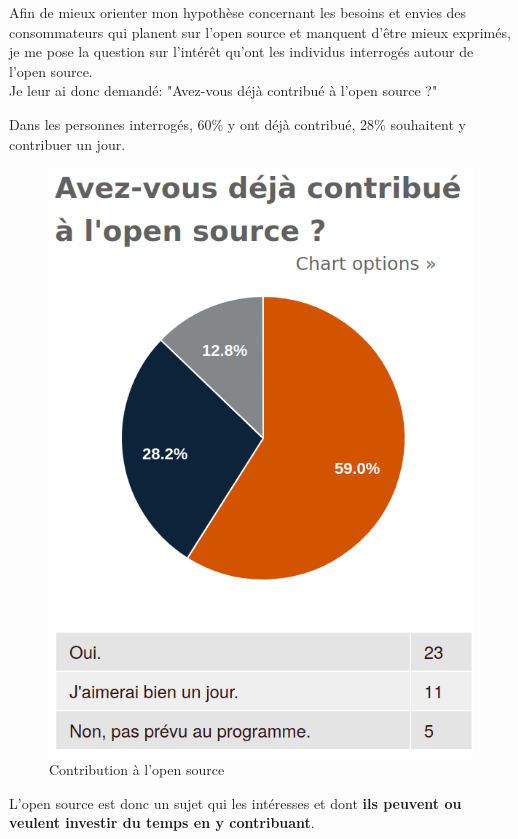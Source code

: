 			Afin de mieux orienter mon hypothèse concernant les besoins et envies des consommateurs qui planent sur l'open source et manquent d'être mieux exprimés, je me pose la question sur l'intérêt qu'ont les individus interrogés autour de l'open source.\\

			Je leur ai donc demandé: "Avez-vous déjà contribué à l'open source ?"

			Dans les personnes interrogés, 60\% y ont déjà contribué, 28\% souhaitent y contribuer un jour.

			\begin{figure}[!htb]
				\center
				\includegraphics[scale=0.28]{./img/contribution}
				\caption{Contribution à l'open source}
			\end{figure}

			L'open source est donc un sujet qui les intéresses et dont \textbf{ils peuvent ou veulent investir du temps en y contribuant}.\\

